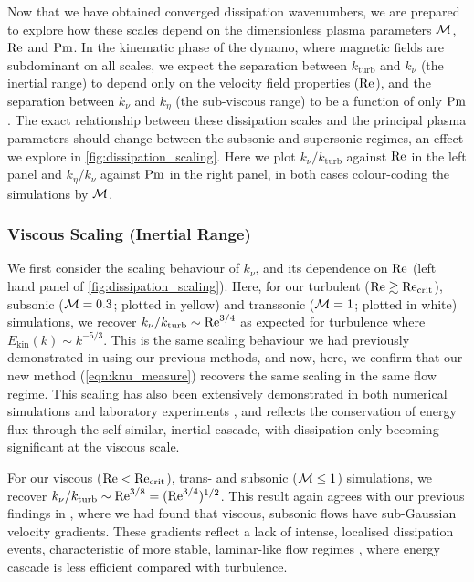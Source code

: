 Now that we have obtained converged dissipation wavenumbers, we are prepared to explore how these scales depend on the dimensionless plasma parameters $\mathcal{M}$, $\mathrm{Re}$ and $\mathrm{Pm}$. In the kinematic phase of the dynamo, where magnetic fields are subdominant on all scales, we expect the separation between $k_\mathrm{turb}$ and $k_\nu$ (\ie the inertial range) to depend only on the velocity field properties (\ie $\mathrm{Re}$), and the separation between $k_\nu$ and $k_\eta$ (\ie the sub-viscous range) to be a function of only $\mathrm{Pm}$. The exact relationship between these dissipation scales and the principal plasma parameters should change between the subsonic and supersonic regimes, an effect we explore in \autoref{fig:dissipation_scaling}. Here we plot $k_\nu / k_\mathrm{turb}$ against $\mathrm{Re}$ in the left panel and $k_\eta / k_\nu$ against $\mathrm{Pm}$ in the right panel, in both cases colour-coding the simulations by $\mathcal{M}$.

\subsubsection{Viscous Scaling (Inertial Range)}
\label{sec:results:dissipation:knu}

We first consider the scaling behaviour of $k_\nu$, and its dependence on $\mathrm{Re}$ (left hand panel of \autoref{fig:dissipation_scaling}). Here, for our turbulent ($\mathrm{Re} \gtrsim \mathrm{Re}_\mathrm{crit}$), subsonic ($\mathcal{M} = 0.3$; plotted in yellow) and transsonic ($\mathcal{M} = 1$; plotted in white) simulations, we recover $k_\nu / k_\mathrm{turb} \sim \mathrm{Re}^{3/4}$ as expected for \citet{kolmogorov1941dissipation} turbulence where $E_{\mathrm{kin}}(k) \sim k^{-5/3}$. This is the same scaling behaviour we had previously demonstrated in  using our previous methods, and now, here, we confirm that our new method (\autoref{eqn:knu_measure}) recovers the same scaling in the same flow regime. This scaling has also been extensively demonstrated in both numerical simulations \citep{yeung1997universality, schumacher2007sub, schumacher2014small} and laboratory experiments \citep{barenblatt1997scaling}, and reflects the conservation of energy flux through the self-similar, inertial cascade, with dissipation only becoming significant at the viscous scale.

For our viscous ($\mathrm{Re} < \mathrm{Re}_\mathrm{crit}$), trans- and subsonic ($\mathcal{M} \leq 1$) simulations, we recover $k_\nu / k_\mathrm{turb} \sim \mathrm{Re}^{3/8} = (\mathrm{Re}^{3/4})^{1/2}$. This result again agrees with our previous findings in , where we had found that viscous, subsonic flows have sub-Gaussian velocity gradients. These gradients reflect a lack of intense, localised dissipation events, characteristic of more stable, laminar-like flow regimes \citep[\eg][]{schumacher2007sub, schumacher2014small}, where energy cascade is less efficient compared with \citet{kolmogorov1941dissipation} turbulence.

